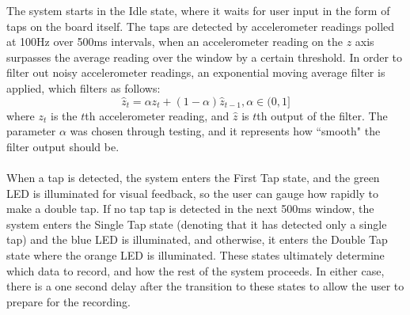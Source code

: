 The system starts in the Idle state, where it waits for user input in the form of taps on the board
itself. The taps are detected by accelerometer readings polled at 100Hz over 500ms intervals, when
an accelerometer reading on the $z$ axis surpasses the average reading over the window by a certain
threshold. In order to filter out noisy accelerometer readings, an exponential moving average filter
is applied, which filters as follows:
\begin{equation}
	\hat{z}_{t} = \alpha z_{t} + (1-\alpha)\hat{z}_{t-1}, \alpha\in(0,1]
\end{equation}
where $z_t$ is the $t$th accelerometer reading, and $\hat{z}$ is $t$th output of the filter. The
parameter $\alpha$ was chosen through testing, and it represents how ``smooth" the filter output
should be.\\\\
When a tap is detected, the system enters the First Tap state, and the green LED is illuminated for
visual feedback, so the user can gauge how rapidly to make a double tap. If no tap tap is detected
in the next 500ms window, the system enters the Single Tap state (denoting that it has detected only
a single tap) and the blue LED is illuminated, and otherwise, it enters the Double Tap state where
the orange LED is illuminated. These states ultimately determine
which data to record, and how the rest of the system proceeds. In either case, there is a one second
delay after the transition to these states to allow the user to prepare for the recording.
